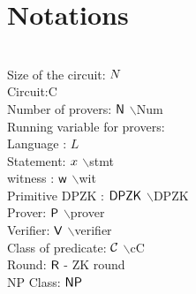\section{Notations}
\\
Size of the circuit: $N$\\
Circuit:C\\
Number of provers: $\mathsf{N}$ $\backslash$Num\\
Running variable for provers:\\
Language : $L$\\
Statement: ${x}$ $\backslash$stmt\\
witness : $\mathsf{w}$ $\backslash$wit\\
Primitive DPZK : $\mathsf{DPZK}$ $\backslash$DPZK\\
Prover: $\mathsf{P}$ $\backslash$prover\\
Verifier: $\mathsf{V}$ $\backslash$verifier\\
Class of predicate: ${\mathcal{C}}$ $\backslash$cC\\
Round: $\mathsf{R}$ - ZK round\\
NP Class: $\mathsf{NP}$\\